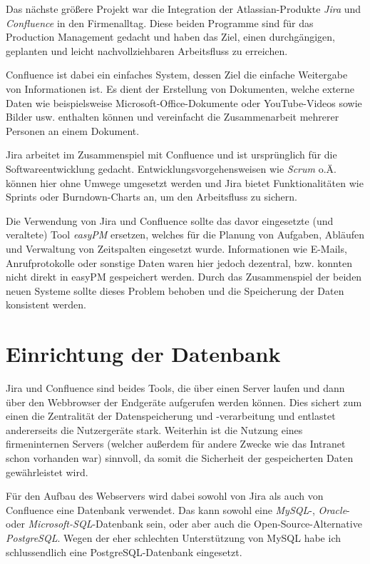 \documentclass[xcolor=dvipsnames,11pt,paper=a4paper]{report}
\begin{document}
Das nächste größere Projekt war die Integration der Atlassian-Produkte \textit{Jira}
und \textit{Confluence} in den Firmenalltag. Diese beiden Programme sind für das
Production Management gedacht und haben das Ziel, einen durchgängigen, geplanten
und leicht nachvollziehbaren Arbeitsfluss zu erreichen.

Confluence ist dabei ein einfaches System, dessen Ziel die einfache Weitergabe von
Informationen ist. Es dient der Erstellung von Dokumenten, welche externe Daten
wie beispielsweise Microsoft-Office-Dokumente oder YouTube-Videos sowie Bilder usw.
enthalten können und vereinfacht die Zusammenarbeit mehrerer Personen an einem Dokument.

Jira arbeitet im Zusammenspiel mit Confluence und ist ursprünglich für die Softwareentwicklung
gedacht. Entwicklungsvorgehensweisen wie \textit{Scrum} o.Ä. können hier ohne Umwege
umgesetzt werden und Jira bietet Funktionalitäten wie Sprints oder Burndown-Charts
an, um den Arbeitsfluss zu sichern.

Die Verwendung von Jira und Confluence sollte das davor eingesetzte (und veraltete)
Tool \textit{easyPM} ersetzen, welches für die Planung von Aufgaben, Abläufen und
Verwaltung von Zeitspalten eingesetzt wurde. Informationen wie E-Mails, Anrufprotokolle
oder sonstige Daten waren hier jedoch dezentral, bzw. konnten nicht direkt in easyPM
gespeichert werden. Durch das Zusammenspiel der beiden neuen Systeme sollte dieses
Problem behoben und die Speicherung der Daten konsistent werden.



\section{Einrichtung der Datenbank}

Jira und Confluence sind beides Tools, die über einen Server laufen und dann über
den Webbrowser der Endgeräte aufgerufen werden können. Dies sichert zum einen die
Zentralität der Datenspeicherung und -verarbeitung und entlastet andererseits die
Nutzergeräte stark. Weiterhin ist die Nutzung eines firmeninternen Servers (welcher
außerdem für andere Zwecke wie das Intranet schon vorhanden war) sinnvoll, da somit
die Sicherheit der gespeicherten Daten gewährleistet wird.

Für den Aufbau des Webservers wird dabei sowohl von Jira als auch von Confluence
eine Datenbank verwendet. Das kann sowohl eine \textit{MySQL}-, \textit{Oracle}-
oder \textit{Microsoft-SQL}-Datenbank sein, oder aber auch die Open-Source-Alternative
\textit{PostgreSQL}. Wegen der eher schlechten Unterstützung von MySQL habe ich
schlussendlich eine PostgreSQL-Datenbank eingesetzt.
\end{document}
